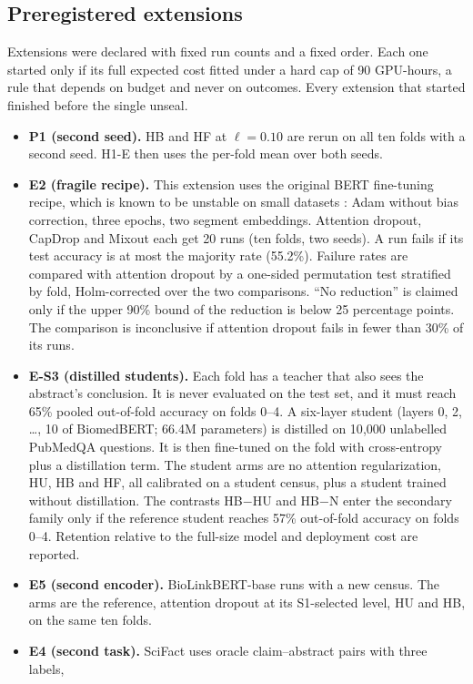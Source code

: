 \subsection{Preregistered extensions}
Extensions were declared with fixed run counts and a fixed order. Each one started only if its full expected cost
fitted under a hard cap of 90 GPU-hours, a rule that depends on budget and never on outcomes. Every extension that started
finished before the single unseal.
\begin{itemize}
\item \textbf{P1 (second seed).} HB and HF at $\ell=0.10$ are rerun on all ten folds with a second seed. H1-E then
uses the per-fold mean over both seeds.
\item \textbf{E2 (fragile recipe).} This extension uses the original BERT fine-tuning recipe, which is known to be unstable
on small datasets \citep{mosbach2021stability}: Adam without bias correction, three epochs, two segment embeddings. Attention dropout, CapDrop and Mixout each get 20 runs (ten folds, two seeds). A run
fails if its test accuracy is at most the majority rate (55.2\%). Failure rates are compared with attention dropout by
a one-sided permutation test stratified by fold, Holm-corrected over the two comparisons. ``No reduction'' is claimed
only if the upper 90\% bound of the reduction is below 25 percentage points. The comparison is inconclusive if
attention dropout fails in fewer than 30\% of its runs.
\item \textbf{E-S3 (distilled students).} Each fold has a teacher that also sees the abstract's conclusion. It is
never evaluated on the test set, and it must reach 65\% pooled out-of-fold accuracy on folds 0--4. A six-layer
student (layers 0, 2, \dots, 10 of BiomedBERT; 66.4M parameters) is distilled on 10{,}000 unlabelled PubMedQA questions.
It is then fine-tuned on the fold with cross-entropy plus a distillation term. The student arms are no attention
regularization, HU, HB and HF, all calibrated on a student census, plus a student trained without distillation. The
contrasts HB$-$HU and HB$-$N enter the secondary family only if the reference student reaches 57\% out-of-fold
accuracy on folds 0--4. Retention relative to the full-size model and deployment cost are reported.
\item \textbf{E5 (second encoder).} BioLinkBERT-base \citep{yasunaga2022linkbert} runs with a new census. The arms are
the reference, attention dropout at its S1-selected level, HU and HB, on the same ten folds.
\item \textbf{E4 (second task).} SciFact \citep{wadden2020scifact} uses oracle claim--abstract pairs with three labels,

\end{itemize}
